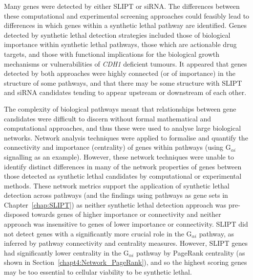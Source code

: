 Many genes were detected by either \gls{SLIPT} or \gls{siRNA}. The differences between these computational and experimental screening approaches could feasibly lead to differences in which genes within a \gls{synthetic lethal} \gls{pathway} are identified. Genes detected by \gls{synthetic lethal} detection strategies included those of biological importance within \gls{synthetic lethal} \glspl{pathway}, those which are actionable drug targets, and those with functional implications for the biological growth mechanisms or vulnerabilities of \textit{CDH1} deficient tumours. It appeared that genes detected by both approaches were highly connected (or of importance) in the  structure of some \glspl{pathway}, and that there may be some structure with \gls{SLIPT} and \gls{siRNA} candidates tending to appear upstream or downstream of each other. 

The complexity of biological \glspl{pathway} meant that relationships between gene candidates were difficult to discern without formal mathematical and computational approaches, and thus these were used to analyse large biological networks. Network analysis techniques were applied to formalise and quantify the connectivity and importance (centrality) of genes within \glspl{pathway} (using G$_{\alpha i}$ signalling as an example). However, these network techniques were unable to identify distinct differences in many of the network properties of genes between those detected as \gls{synthetic lethal} candidates by computational or experimental methods. These network metrics support the application of \gls{synthetic lethal} detection across \glspl{pathway} (and the findings using \glspl{pathway} as gene sets in Chapter~\ref{chap:SLIPT}) as neither \gls{synthetic lethal} detection approach was pre-disposed towards genes of higher importance or connectivity and neither approach was insensitive to genes of lower importance or connectivity. \gls{SLIPT} did not detect genes with a significantly more crucial role in the G$_{\alpha i}$ \gls{pathway}, as inferred by \gls{pathway} connectivity and \gls{centrality} measures. However, \gls{SLIPT} genes had significantly lower centrality in the G$_{\alpha i}$ \gls{pathway} by \gls{PageRank centrality} (as shown in Section~\ref{chapt4:Network_PageRank}), and so the highest scoring genes may be too \gls{essential} to cellular viability to be \gls{synthetic lethal}. 


